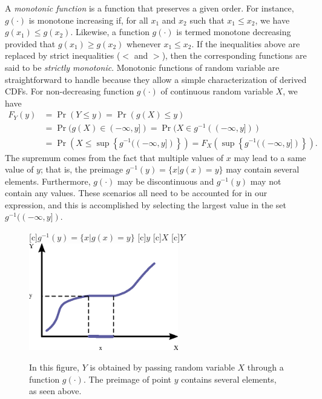 A \emph{monotonic function} is a function that preserves a given order. 
For instance, $g(\cdot)$ is monotone increasing if, for all $x_1$ and $x_2$ such that $x_1 \leq x_2$, we have $g(x_1) \leq g(x_2)$.
Likewise, a function $g(\cdot)$ is termed monotone decreasing provided that $g(x_1) \geq g(x_2)$ whenever $x_1 \leq x_2$.
If the inequalities above are replaced by strict inequalities ($<$ and $>$), then the corresponding functions are said to be \emph{strictly monotonic}. 
Monotonic functions of random variable are straightforward to handle because they allow a simple characterization of derived CDFs.
For non-decreasing function $g(\cdot)$ of continuous random variable $X$, we have
\begin{equation} \label{equation:MonotoneIncreasingCDF}
\begin{split}
F_Y(y) &= \Pr ( Y \leq y) = \Pr ( g(X) \leq y) \\
&= \Pr ( g(X) \in (- \infty, y])
= \Pr ( X \in g^{-1} ( (- \infty, y] ) ) \\
&= \Pr \left( X \leq \sup \left\{ g^{-1} ( (- \infty, y] ) \right\} \right)
= F_X \left( \sup \left\{ g^{-1} ( (- \infty, y] ) \right\} \right) .
\end{split}
\end{equation}
The supremum comes from the fact that multiple values of $x$ may lead to a same value of $y$; that is, the preimage $g^{-1}(y) = \{ x | g(x) = y \}$ may contain several elements.
Furthermore, $g(\cdot)$ may be discontinuous and $g^{-1} (y)$ may not contain any values.
These scenarios all need to be accounted for in our expression, and this is accomplished by selecting the largest value in the set $g^{-1} ( (- \infty, y] )$.

\begin{figure}[ht]
\begin{center}
\begin{psfrags}
[c]{$g^{-1} (y) = \{ x | g(x) = y \}$}
[c]{$y$}
[c]{$X$}
[c]{$Y$}
\includegraphics[width=6.5cm]{Figures/9Chapter/MonotoneIncreasing}
\end{psfrags}
\caption{In this figure, $Y$ is obtained by passing random variable $X$ through a function $g(\cdot)$.
The preimage of point $y$ contains several elements, as seen above.}
\end{center}
\end{figure}


